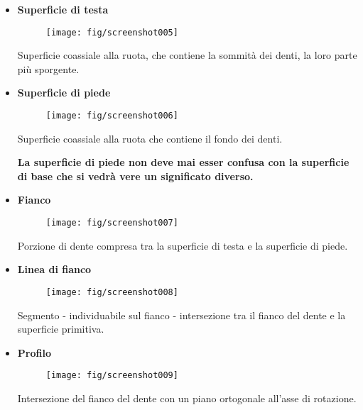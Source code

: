 \documentclass[a4paper, 15pt]{article}
\begin{document}
\begin{adjustwidth}{2in}{}
\begin{itemize}
		\item \textbf{Superficie di testa}
		\begin{figure}[H]
			\centering
			\texttt{[image: fig/screenshot005]}
			\label{fig:screenshot005}
		\end{figure}		
		Superficie coassiale alla ruota, che contiene la sommità dei denti, la loro parte più sporgente.
\newpage		
		\item \textbf{Superficie di piede}
		\begin{figure}[H]
			\centering
			\texttt{[image: fig/screenshot006]}
			\label{fig:screenshot006}
		\end{figure}
		Superficie coassiale alla ruota che contiene il fondo dei denti. \newline
		
		\textbf{La superficie di piede non deve mai esser confusa con la superficie di base che si vedrà vere un significato diverso.}
		
		\item \textbf{Fianco}
		\begin{figure}[H]
			\centering
			\texttt{[image: fig/screenshot007]}
			\label{fig:screenshot007}
		\end{figure}
		Porzione di dente compresa tra la superficie di testa e la superficie di piede.
		
		\item \textbf{Linea di fianco}
		\begin{figure}[H]
			\centering
			\texttt{[image: fig/screenshot008]}
			\label{fig:screenshot008}
		\end{figure}
		Segmento - individuabile sul fianco - intersezione tra il fianco del dente e la superficie primitiva.
		
		\item \textbf{Profilo}
		\begin{figure}[H]
			\centering
			\texttt{[image: fig/screenshot009]}
			\label{fig:screenshot009}
		\end{figure}
		Intersezione del fianco del dente con un piano ortogonale all'asse di rotazione.
		
\newpage


\end{itemize}
\end{adjustwidth}
\end{document}
